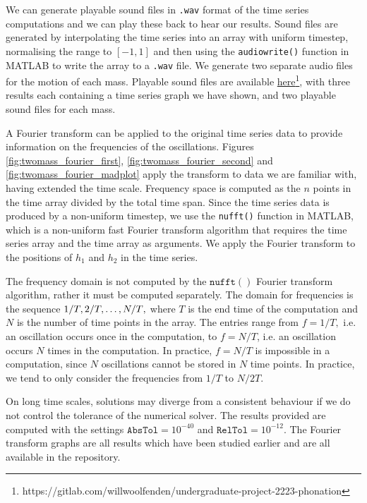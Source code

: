 We can generate playable sound files in \texttt{.wav} format of the time series computations and we can play these back to hear our results.
Sound files are generated by interpolating the time series into an array with uniform timestep,
normalising the range to $[-1,1]$
and then using the \texttt{audiowrite()} function in MATLAB to write the array to a \texttt{.wav} file.
We generate two separate audio files for the motion of each mass.
Playable sound files are available \hyperlink{https://gitlab.com/willwoolfenden/undergraduate-project-2223-phonation}{here}\footnote{https://gitlab.com/willwoolfenden/undergraduate-project-2223-phonation},
with three results each containing a time series graph we have shown,
and two playable sound files for each mass.

A Fourier transform \cite{grigoryan_2018} can be applied to the original time series data to provide information on the frequencies of the oscillations.
Figures \ref{fig:twomass_fourier_first},
\ref{fig:twomass_fourier_second} and \ref{fig:twomass_fourier_madplot} apply the transform to data we are familiar with,
having extended the time scale.
Frequency space is computed as the $n$ points in the time array divided by the total time span.
Since the time series data is produced by a non-uniform timestep,
we use the \texttt{nufft()} function in MATLAB,
which is a non-uniform fast Fourier transform algorithm that requires the time series array and the time array as arguments.
We apply the Fourier transform to the positions of $h_1$ and $h_2$ in the time series.

The frequency domain is not computed by the $\mathtt{nufft()}$ Fourier transform algorithm,
rather it must be computed separately.
The domain for frequencies is the sequence ${1/T, 2/T, \mathellipsis, N/T},$
where $T$ is the end time of the computation and $N$ is the number of time points in the array.
The entries range from $f = 1/T,$ i.e. an oscillation occurs once in the computation,
to $f = N/T$, i.e. an oscillation occurs $N$ times in the computation.
In practice, $f=N/T$ is impossible in a computation,
since $N$ oscillations cannot be stored in $N$ time points.
In practice, we tend to only consider the frequencies from $1/T$ to $N/2T$.

On long time scales, solutions may diverge from a consistent behaviour if we do not control the tolerance of the numerical solver.
The results provided are computed with the settings $\mathtt{AbsTol}=10^{-40}$ and $\texttt{RelTol}=10^{-12}$.
The Fourier transform graphs are all results which have been studied earlier and are all available in the repository.

